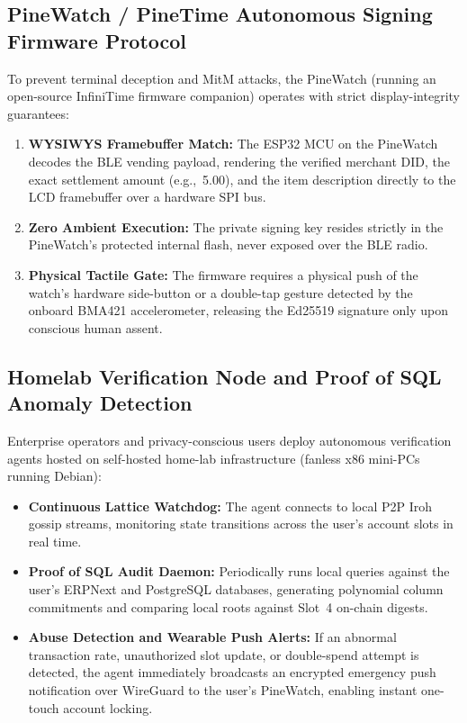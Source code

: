 \documentclass[a4paper,11pt,twoside,parskip=half-,headings=small]{scrartcl}
\newcommand{\EUR}[1]{\texteuro\,#1}
\begin{document}
\subsection{PineWatch / PineTime Autonomous Signing Firmware Protocol}
\label{sec:pinewatch_protocol}

To prevent terminal deception and MitM attacks, the PineWatch (running an open-source
InfiniTime firmware companion) operates with strict display-integrity guarantees:
\begin{enumerate}
  \item \textbf{WYSIWYS Framebuffer Match:} The ESP32 MCU on the PineWatch decodes the
BLE vending payload, rendering the verified merchant DID, the exact settlement amount
(e.g., \EUR{5.00}), and the item description directly to the LCD framebuffer over
a hardware SPI bus.
  \item \textbf{Zero Ambient Execution:} The private signing key resides strictly in the
PineWatch's protected internal flash, never exposed over the BLE radio.
  \item \textbf{Physical Tactile Gate:} The firmware requires a physical push of the watch's
hardware side-button or a double-tap gesture detected by the onboard BMA421
accelerometer, releasing the Ed25519 signature only upon conscious human assent.
\end{enumerate}

\subsection{Homelab Verification Node and Proof of SQL Anomaly Detection}
\label{sec:homelab_agent}

Enterprise operators and privacy-conscious users deploy autonomous verification agents
hosted on self-hosted home-lab infrastructure (fanless x86 mini-PCs running Debian):
\begin{itemize}
  \item \textbf{Continuous Lattice Watchdog:} The agent connects to local P2P Iroh gossip
streams, monitoring state transitions across the user's account slots in real time.
  \item \textbf{Proof of SQL Audit Daemon:} Periodically runs local queries against the
user's ERPNext and PostgreSQL databases, generating polynomial column commitments
and comparing local roots against Slot~4 on-chain digests.
  \item \textbf{Abuse Detection and Wearable Push Alerts:} If an abnormal transaction rate,
unauthorized slot update, or double-spend attempt is detected, the agent immediately
broadcasts an encrypted emergency push notification over WireGuard to the user's
PineWatch, enabling instant one-touch account locking.
\end{itemize}
\end{document}

